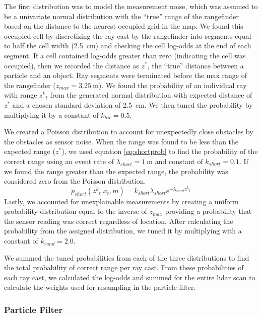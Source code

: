 \documentclass[journal]{IEEEtran}
\begin{document}
            The first distribution was to model the measurement noise, which was assumed to be a univariate normal distribution with the “true” range of the rangefinder based on the distance to the nearest occupied grid in the map. We found this occupied cell by discretizing the ray cast by the rangefinder into segments equal to half the cell width (\SI{2.5}{\centi\meter}) and checking the cell log-odds at the end of each segment. If a cell contained log-odds greater than zero (indicating the cell was occupied), then we recorded the distance as $z^{*}$, the “true” distance between a particle and an object. Ray segments were terminated before the max range of the rangefinder  ($z_{max}=\SI{3.25}{\meter}$). We found the probability of an individual ray with range $ z{^k}_t $ from the generated normal distribution with expected distance of $z^{*}$ and a chosen standard deviation of \SI{2.5}{\centi\meter}. We then tuned the probability by multiplying it by a constant of $k_{hit}=0.5$.
            
            We created a Poisson distribution to account for unexpectedly close obstacles by the obstacles as sensor noise. When the range was found to be less than the expected range ($z^{*}$), we used equation \ref{eq:shortprob} to find the probability of the correct range using an event rate of $\lambda_{short} = \SI{1}{\meter}$ and constant of $k_{short} =0.1$. If we found the range greater than the expected range, the probability was considered zero from the Poisson distribution.
            \begin{equation}
            	\label{eq:shortprob}
            	p_{short}(z{^k}_t |x_t,m) = k_{short}\lambda_{short}e^{-\lambda_{short}z{^k}_t}
            \end{equation}
            Lastly, we accounted for unexplainable measurements by creating a uniform probability distribution equal to the inverse of $z_{max}$ providing a probability that the sensor reading was correct regardless of location. After calculating the probability from the assigned distribution, we tuned it by multiplying with a constant of $k_{rand}=2.0$.
            
            We summed the tuned probabilities from each of the three distributions to find the total probability of correct range per ray cast. From these probabilities of each ray cast, we calculated the log-odds and summed for the entire lidar scan to calculate the weights used for resampling in the particle filter.
            
        \subsubsection{Particle Filter}
        
\end{document}

